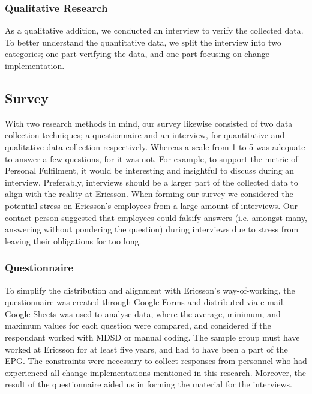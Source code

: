 \documentclass[final_report_innit.tex]{subfiles}
\begin{document}
\subsubsection{Qualitative Research}\label{approachQual}
As a qualitative addition, we conducted an interview to verify the collected data. To better understand the quantitative data, we split the interview into two categories; one part verifying the data, and one part focusing on change implementation.

\subsection{Survey}\label{approachSurvey}
With two research methods in mind, our survey likewise consisted of two data collection techniques; a questionnaire and an interview, for quantitative and qualitative data collection respectively. Whereas a scale from 1 to 5 was adequate to answer a few questions, for it was not. For example, to support the metric of Personal Fulfilment, it would be interesting and insightful to discuss during an interview. Preferably, interviews should be a larger part of the collected data to align with the reality at Ericsson. When forming our survey we considered the potential stress on Ericsson's employees from a large amount of interviews. Our contact person suggested that employees could falsify answers (i.e. amongst many, answering without pondering the question) during interviews due to stress from leaving their obligations for too long. 
\\

\subsubsection{Questionnaire}\label{approachInQuest}
To simplify the distribution and alignment with Ericsson's way-of-working, the questionnaire was created through Google Forms and distributed via e-mail. Google Sheets was used to analyse data, where the average, minimum, and maximum values for each question were compared, and considered if the respondant worked with MDSD or manual coding. The sample group must have worked at Ericsson for at least five years, and had to have been a part of the EPG. The constraints were necessary to collect responses from personnel who had experienced all change implementations mentioned in this research. Moreover, the result of the questionnaire aided us in forming the material for the interviews. 
\\
\end{document}
